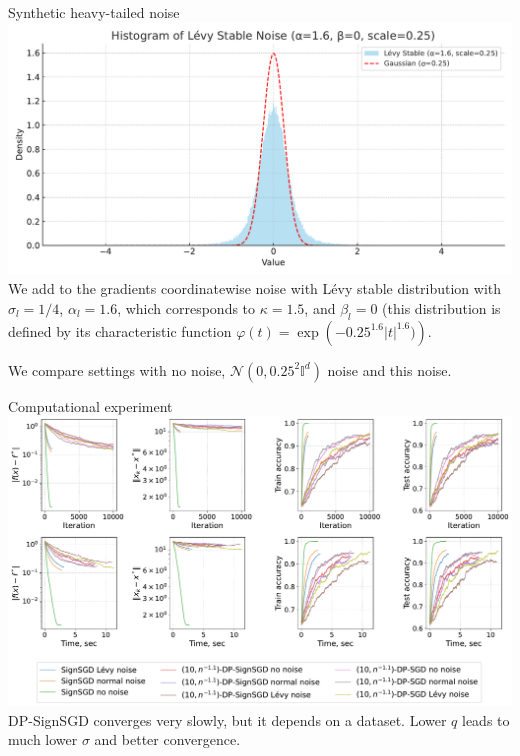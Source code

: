 \documentclass{beamer}
\begin{document}
\begin{frame}{Synthetic heavy-tailed noise}
\includegraphics[width=1.0\textwidth]{levy_stable_histogram} 
We add to the gradients coordinatewise noise with Lévy stable distribution with $\sigma_l = 1/4$, $\alpha_l=1.6$, which corresponds to $\kappa=1.5$, and $\beta_l=0$ (this distribution is defined by its characteristic function $\varphi(t)=\exp\left(-0.25^{1.6}|t|^{1.6})\right)$.

We compare settings with no noise, $\mathcal{N}(0, 0.25^2\mathbb{I}^d)$ noise and this noise.
\end{frame}
\begin{frame}{Computational experiment}
    \includegraphics[width=1.0\textwidth]{v28_constant_step/long/v28_constant_step_long.pdf} 
DP-SignSGD converges very slowly, but it depends on a dataset. Lower $q$ leads to much lower $\sigma$ and better convergence.
\end{frame}
\end{document}
